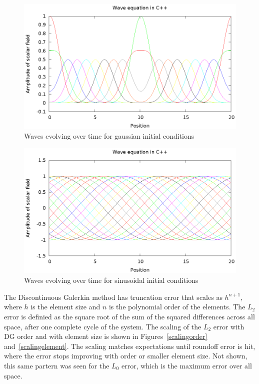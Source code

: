 \begin{figure}
  \includegraphics{gaussWave}
  \caption{Waves evolving over time for gaussian initial conditions}
  \label{gaussWave}
\end{figure}

\begin{figure}
  \includegraphics{sineWave}
  \caption{Waves evolving over time for sinusoidal initial conditions}
  \label{sineWave}
\end{figure}

The Discontinuous Galerkin method has truncation error that scales as $h^{n+1}$, where $h$ is the element size and $n$ is the polynomial order of the elements. The $L_2$ error is definied as the square root of the sum of the squared differences across all space, after one complete cycle of the system. The scaling of the $L_2$ error with DG order and with element size is shown in Figures~\ref{scalingorder} and~\ref{scalingelement}. The scaling matches expectations until roundoff error is hit, where the error stops improving with order or smaller element size. Not shown, this same partern was seen for the $L_0$ error, which is the maximum error over all space.

